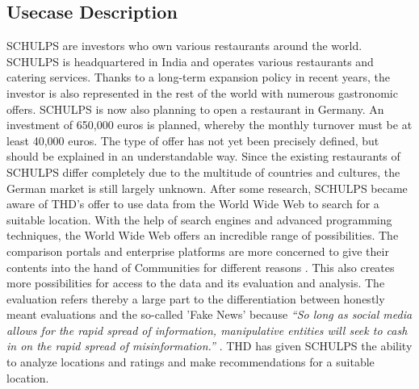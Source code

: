 \subsection{Usecase Description}
\label{subsec:usecase}
SCHULPS are investors who own various restaurants around the world. SCHULPS is headquartered in India and operates various restaurants and catering services. Thanks to a long-term expansion policy in recent years, the investor is also represented in the rest of the world with numerous gastronomic offers. SCHULPS is now also planning to open a restaurant in Germany. An investment of 650,000 euros is planned, whereby the monthly turnover must be at least 40,000 euros. The type of offer has not yet been precisely defined, but should be explained in an understandable way. Since the existing restaurants of SCHULPS differ completely due to the multitude of countries and cultures, the German market is still largely unknown. After some research, SCHULPS became aware of THD's offer to use data from the World Wide Web to search for a suitable location. With the help of search engines and advanced programming techniques, the World Wide Web offers an incredible range of possibilities. The comparison portals and enterprise platforms are more concerned to give their contents into the hand of Communities for different reasons \cite{SocialBusiness}. This also creates more possibilities for access to the data and its evaluation and analysis. The evaluation refers thereby a large part to the differentiation between honestly meant evaluations and the so-called 'Fake News' because \textit{``So long as social media allows for the rapid spread of information, manipulative entities will seek to cash in on the rapid spread of misinformation.''} \cite{FakeNews}.
THD has given SCHULPS the ability to analyze locations and ratings and make recommendations for a suitable location.
